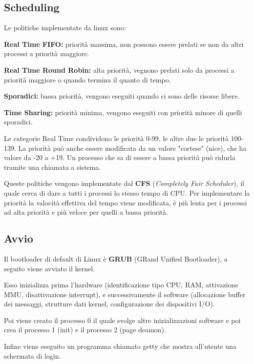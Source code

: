 \subsection{Scheduling}
Le politiche implementate da linux sono:
\begin{sitemize}
    \item \textbf{Real Time FIFO:} priorità massima, non possono essere prelati se non da altri processi a priorità maggiore.
    \item \textbf{Real Time Round Robin:} alta priorità, vegnono prelati solo da processi a priorità maggiore o quando termina il quanto di tempo.
    \item \textbf{Sporadici:} bassa priorità, vengono eseguiti quando ci sono delle risorse libere.
    \item \textbf{Time Sharing:} priorità minima, vengono eseguiti con priorità minore di quelli sporadici.
\end{sitemize}

\spacer
Le categorie Real Time condividono le priorità 0-99, le altre due le priorità 100-139.
La priorità può anche essere modificata da un valore "cortese" (nice), che ha valore da -20 a +19. Un processo che sa di essere a bassa priorità può ridurla tramite una chiamata a sistema.

\spacer
Queste politiche vengono implementate dal \textbf{CFS} (\textit{Completely Fair Scheduler}), il quale cerca di dare a tutti i processi lo stesso tempo di CPU.
Per implementare la priorità la valocità effettiva del tempo viene modificata, è più lenta per i processi ad alta priorità e più veloce per quelli a bassa priorità.

\subsection{Avvio}
Il bootloader di default di Linux è  \textbf{GRUB} (GRand Unified Bootloader), a seguito viene avviato il kernel.

Esso inizializza prima l'hardware (identificazione tipo CPU, RAM, attivazione MMU, disattivazione interrupt), e successivamente il software (allocazione buffer dei messaggi, strutture dati kernel, configurazione dei dispositivi I/O).

Poi viene creato il processo 0 il quale svolge altre inizializzazioni software e poi crea il processo 1 (init) e il processo 2 (page deamon).

Infine viene eseguito un programma chiamato getty che mostra all'utente una schermata di login.

